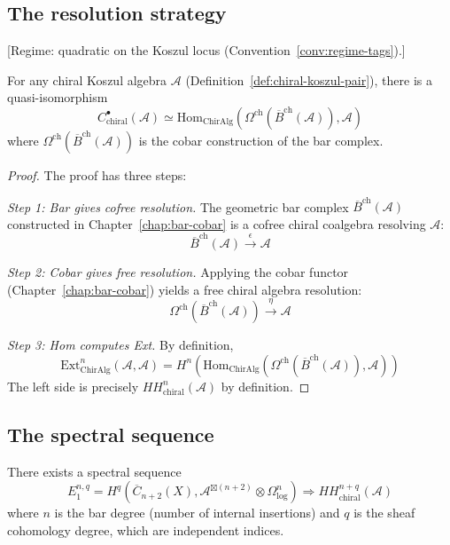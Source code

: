 \subsection{The resolution strategy}

\begin{theorem}\label{thm:hochschild-bar-cobar}
\textup{[Regime: quadratic on the Koszul locus
\textup{(}Convention~\textup{\ref{conv:regime-tags})}.]}

For any chiral Koszul algebra $\mathcal{A}$
\textup{(}Definition~\textup{\ref{def:chiral-koszul-pair})},
there is a quasi-isomorphism
\[
C^{\bullet}_{\text{chiral}}(\mathcal{A}) \simeq \text{Hom}_{\text{ChirAlg}}(\Omega^{\text{ch}}(\overline{B}^{\text{ch}}(\mathcal{A})), \mathcal{A})
\]
where $\Omega^{\text{ch}}(\overline{B}^{\text{ch}}(\mathcal{A}))$ is the cobar construction of the bar complex.
\end{theorem}

\begin{proof}
The proof has three steps:

\emph{Step 1: Bar gives cofree resolution.} 
The geometric bar complex $\overline{B}^{\text{ch}}(\mathcal{A})$ constructed in Chapter~\ref{chap:bar-cobar} is a cofree chiral coalgebra resolving $\mathcal{A}$:
\[
\overline{B}^{\text{ch}}(\mathcal{A}) \xrightarrow{\epsilon} \mathcal{A}
\]

\emph{Step 2: Cobar gives free resolution.}
Applying the cobar functor (Chapter~\ref{chap:bar-cobar}) yields a free chiral algebra resolution:
\[
\Omega^{\text{ch}}(\overline{B}^{\text{ch}}(\mathcal{A})) \xrightarrow{\eta} \mathcal{A}
\]

\emph{Step 3: Hom computes Ext.}
By definition, 
\[
\text{Ext}^n_{\text{ChirAlg}}(\mathcal{A}, \mathcal{A}) = H^n(\text{Hom}_{\text{ChirAlg}}(\Omega^{\text{ch}}(\overline{B}^{\text{ch}}(\mathcal{A})), \mathcal{A}))
\]
The left side is precisely $HH^n_{\text{chiral}}(\mathcal{A})$ by definition.
\end{proof}

\subsection{The spectral sequence}

\begin{theorem}\label{thm:hochschild-spectral-sequence}
There exists a spectral sequence
\[
E_1^{n,q} = H^q(\overline{C}_{n+2}(X), \mathcal{A}^{\boxtimes (n+2)} \otimes \Omega^n_{\log}) \Rightarrow HH^{n+q}_{\text{chiral}}(\mathcal{A})
\]
where $n$ is the bar degree (number of internal insertions) and $q$ is the sheaf cohomology degree, which are independent indices.
\end{theorem}

